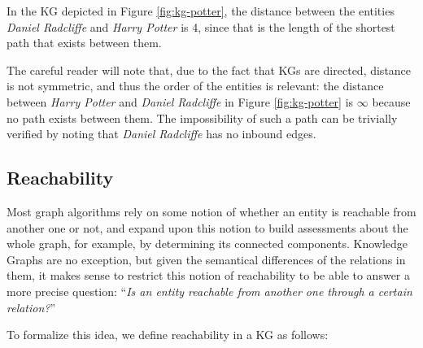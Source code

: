 
In the KG depicted in Figure \ref{fig:kg-potter}, the distance between the entities \textit{Daniel Radcliffe} and \textit{Harry Potter} is 4, since that is the length of the shortest path that exists between them. 

The careful reader will note that, due to the fact that KGs are directed, distance is not symmetric, and thus the order of the entities is relevant: the distance between \textit{Harry Potter} and \textit{Daniel Radcliffe} in Figure \ref{fig:kg-potter} is $\infty$ because no path exists between them. The impossibility of such a path can be trivially verified by noting that \textit{Daniel Radcliffe} has no inbound edges.

\subsection{Reachability}
Most graph algorithms rely on some notion of whether an entity is reachable from another one or not, and expand upon this notion to build assessments about the whole graph, for example, by determining its connected components. Knowledge Graphs are no exception, but given the semantical differences of the relations in them, it makes sense to restrict this notion of reachability to be able to answer a more precise question: ``\textit{Is an entity reachable from another one through a certain relation?}''

To formalize this idea, we define reachability in a KG as follows:


